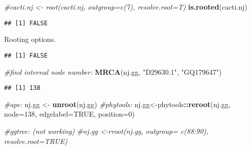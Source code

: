 \documentclass[
]{article}
\newenvironment{Shaded}{\begin{snugshade}}{\end{snugshade}}
\newcommand{\CommentTok}[1]{\textcolor[rgb]{0.56,0.35,0.01}{\textit{#1}}}
\newcommand{\DataTypeTok}[1]{\textcolor[rgb]{0.13,0.29,0.53}{#1}}
\newcommand{\DecValTok}[1]{\textcolor[rgb]{0.00,0.00,0.81}{#1}}
\newcommand{\KeywordTok}[1]{\textcolor[rgb]{0.13,0.29,0.53}{\textbf{#1}}}
\newcommand{\NormalTok}[1]{#1}
\newcommand{\OperatorTok}[1]{\textcolor[rgb]{0.81,0.36,0.00}{\textbf{#1}}}
\newcommand{\OtherTok}[1]{\textcolor[rgb]{0.56,0.35,0.01}{#1}}
\newcommand{\StringTok}[1]{\textcolor[rgb]{0.31,0.60,0.02}{#1}}
\begin{document}
\begin{Shaded}
\begin{Highlighting}[]
\CommentTok{#cacti.nj <- root(cacti.nj, outgroup=c(7), resolve.root=T)}
\KeywordTok{is.rooted}\NormalTok{(cacti.nj)}
\end{Highlighting}
\end{Shaded}

\begin{verbatim}
## [1] FALSE
\end{verbatim}

Rooting options.

\begin{Shaded}
\end{Shaded}

\begin{verbatim}
## [1] FALSE
\end{verbatim}

\begin{Shaded}
\begin{Highlighting}[]
\CommentTok{#find internal node number:}
\KeywordTok{MRCA}\NormalTok{(nj.gg, }\StringTok{"D29630.1"}\NormalTok{, }\StringTok{"GQ179647"}\NormalTok{)}
\end{Highlighting}
\end{Shaded}

\begin{verbatim}
## [1] 138
\end{verbatim}

\begin{Shaded}
\begin{Highlighting}[]
\CommentTok{#ape:}
\NormalTok{nj.gg <-}\StringTok{ }\KeywordTok{unroot}\NormalTok{(nj.gg)}
\CommentTok{#phytools:}
\NormalTok{nj.gg<-phytools}\OperatorTok{::}\KeywordTok{reroot}\NormalTok{(nj.gg, }\DataTypeTok{node=}\DecValTok{138}\NormalTok{, }\DataTypeTok{edgelabel=}\OtherTok{TRUE}\NormalTok{, }\DataTypeTok{position=}\DecValTok{0}\NormalTok{)}

\CommentTok{#ggtree: (not working)}
\CommentTok{#nj.gg <-rroot(nj.gg, outgroup= c(88:90), resolve.root=TRUE)}
\end{Highlighting}
\end{Shaded}
\end{document}
